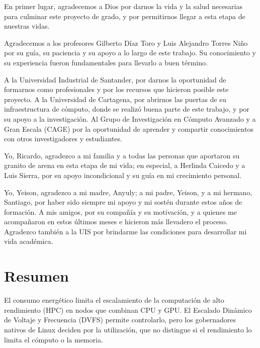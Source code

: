 En primer lugar, agradecemos a Dios por darnos la vida y la salud necesarias para culminar este proyecto de grado, y por permitirnos llegar a esta etapa de nuestras vidas.

Agradecemos a los profesores Gilberto Díaz Toro y Luis Alejandro Torres Niño por su guía, su paciencia y su apoyo a lo largo de este trabajo. Su conocimiento y su experiencia fueron fundamentales para llevarlo a buen término.

A la Universidad Industrial de Santander, por darnos la oportunidad de formarnos como profesionales y por los recursos que hicieron posible este proyecto. A la Universidad de Cartagena, por abrirnos las puertas de su infraestructura de cómputo, donde se realizó buena parte de este trabajo, y por su apoyo a la investigación. Al Grupo de Investigación en Cómputo Avanzado y a Gran Escala (CAGE) por la oportunidad de aprender y compartir conocimientos con otros investigadores y estudiantes.

Yo, Ricardo, agradezco a mi familia y a todas las personas que aportaron su granito de arena en esta etapa de mi vida; en especial, a Herlinda Caicedo y a Luis Sierra, por su apoyo incondicional y su guía en mi crecimiento personal.

Yo, Yeison, agradezco a mi madre, Anyuly; a mi padre, Yeison, y a mi hermano, Santiago, por haber sido siempre mi apoyo y mi sostén durante estos años de formación. A mis amigos, por su compañía y su motivación, y a quienes me acompañaron en estos últimos meses e hicieron más llevadero el proceso. Agradezco también a la UIS por brindarme las condiciones para desarrollar mi vida académica.




\chapter*{Resumen}

El consumo energético limita el escalamiento de la computación de alto rendimiento (HPC) en nodos que combinan CPU y GPU. El Escalado Dinámico de Voltaje y Frecuencia (DVFS) permite controlarlo, pero los gobernadores nativos de Linux deciden por la utilización, que no distingue si el rendimiento lo limita el cómputo o la memoria.

